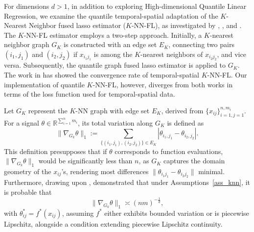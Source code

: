 \documentclass[twoside,11pt]{article}
\begin{document}
For dimensions \(d > 1\), in addition to exploring High-dimensional Quantile Linear Regression, we examine the quantile temporal-spatial adaptation of the \(K\)-Nearest Neighbor fused lasso estimator (\(K\)-NN-FL), as investigated by \cite{elmoataz2008nonlocal}, \cite{ferradans2014regularized}, and \cite{madrid2020adaptive}. The \(K\)-NN-FL estimator employs a two-step approach. Initially, a \(K\)-nearest neighbor graph \(G_K\) is constructed with an edge set \(E_K\), connecting two pairs \((i_1, j_1)\) and \((i_2, j_2)\) if \(x_{i_1j_1}\) is among the \(K\)-nearest neighbors of \(x_{i_2j_2}\), and vice versa. Subsequently, the quantile graph fused lasso estimator is applied to \(G_K\). 
The work in \cite{padilla2023temporal} has showed the convergence rate of temporal-spatial \(K\)-NN-FL. Our implementation of quantile \(K\)-NN-FL, however, diverges from both works in terms of the loss function used for temporal-spatial data.

Let \(G_K\) represent the \(K\)-NN graph with edge set \(E_K\), derived from \(\{x_{ij}\}_{i=1, j=1}^{n,m_i}\). For a signal \(\theta \in \mathbb{R}^{\sum_{i=1}^n m_i}\), its total variation along \(G_K\) is defined as
\begin{equation}
\label{tv_knn}
\|\nabla_{G_k} \theta\|_1 := \sum_{\{(i_1,j_1),(i_2,j_2)\} \in E_K} |\theta_{i_1,j_1} - \theta_{i_2,j_2}|.
\end{equation}
This definition presupposes that if \(\theta\) corresponds to function evaluations, \(\|\nabla_{G_k} \theta\|_1\) would be significantly less than \(n\), as \(G_K\) captures the domain geometry of the \(x_{ij}\)’s, rendering most differences \(\| \theta_{i_1 j_1} - \theta_{i_2 j_2} \|\) minimal. Furthermore, drawing upon \cite{von2014hitting}, \cite{madrid2020adaptive} demonstrated that under Assumptions~\ref{ass_knn}, it is probable that
\begin{equation}
\label{l1_norm_for_knn_reg}
\|\nabla_{G_k} \theta\|_1 \asymp (nm)^{-\frac{1}{d}},
\end{equation}
with \(\theta^*_{ij} = f^*(x_{ij})\), assuming \(f^*\) either exhibits bounded variation or is piecewise Lipschitz, alongside a condition extending piecewise Lipschitz continuity.
\end{document}
